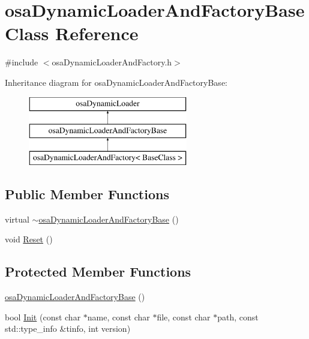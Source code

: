 \hypertarget{classosa_dynamic_loader_and_factory_base}{\section{osa\-Dynamic\-Loader\-And\-Factory\-Base Class Reference}
\label{classosa_dynamic_loader_and_factory_base}
}


{\ttfamily \#include $<$osa\-Dynamic\-Loader\-And\-Factory.\-h$>$}

Inheritance diagram for osa\-Dynamic\-Loader\-And\-Factory\-Base\-:\begin{figure}[H]
\begin{center}
\leavevmode
\includegraphics[height=3.000000cm]{d4/db2/classosa_dynamic_loader_and_factory_base}
\end{center}
\end{figure}
\subsection*{Public Member Functions}
\begin{DoxyCompactItemize}
\item 
virtual \hyperlink{classosa_dynamic_loader_and_factory_base_a22f0748faf02fe8ee9ba2517863cd6ac}{$\sim$osa\-Dynamic\-Loader\-And\-Factory\-Base} ()
\item 
void \hyperlink{classosa_dynamic_loader_and_factory_base_a6e219c62db3beacf9a508e78172e405f}{Reset} ()
\end{DoxyCompactItemize}
\subsection*{Protected Member Functions}
\begin{DoxyCompactItemize}
\item 
\hyperlink{classosa_dynamic_loader_and_factory_base_a8b3e608e8f5d2c182deaca5662dead8e}{osa\-Dynamic\-Loader\-And\-Factory\-Base} ()
\item 
bool \hyperlink{classosa_dynamic_loader_and_factory_base_ab0bb3920f795f8fc07f6ace96faef15e}{Init} (const char $\ast$name, const char $\ast$file, const char $\ast$path, const std\-::type\-\_\-info \&tinfo, int version)
\end{DoxyCompactItemize}

